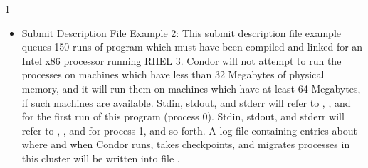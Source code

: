 \begin{ManPage}{\label{man-condor-submit}}{1}
\begin{itemize}
\footnotesize
\begin{verbatim}
      ####################
      #
      # submit description file
      # Example 1: queuing multiple jobs with differing
      # command line arguments and output files.
      #                                                                      
      ####################                                                   
                                                                         
      Executable     = foo                                                   
      Universe       = standard
                                                                         
      Arguments      = 15 2000                                               
      Output  = foo.out1                                                     
      Error   = foo.err1
      Queue                                                                  
                                                                         
      Arguments      = 30 2000                                               
      Output  = foo.out2                                                     
      Error   = foo.err2
      Queue                                                                  
                                                                         
      Arguments      = 45 6000                                               
      Output  = foo.out3                                                     
      Error   = foo.err3
      Queue                   
\end{verbatim}
\normalsize

\item{Submit Description File Example 2:} This submit description file
example queues 150
runs of program  which must have been compiled and linked for
an Intel x86 processor running RHEL 3.
Condor will not attempt
to run the processes on machines which have less than 32 Megabytes of
physical memory, and it will run them on machines which have at least 64
Megabytes, if such machines are available.
Stdin, stdout, and stderr will
refer to , , and  for the first run
of this program (process 0).
Stdin, stdout, and stderr will refer to
, , and  for process 1, and so forth.
A log file containing entries
about where and when Condor runs, takes checkpoints, and migrates processes
in this cluster will be written into file .


\end{itemize}
\end{ManPage}

